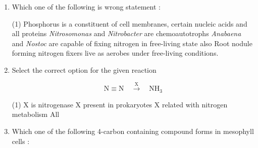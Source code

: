 \documentclass[twocolumn]{article}
\begin{document}
\begin{enumerate}
    Some plasmids may have only one or two copies per cell whereas others may have 15--100 copies per cell.
    
    Statement II :
    
    Plasmids and Bacteriophage have the ability to replicate within bacterial cell independent of the control of chromosomal DNA.
    
    Choose the correct answer from the option given
    below:
    
    \begin{tasks}(1)
        \task Both Statement I and Statement II are incorrect
        \task Statement I is correct but Statement II is incorrect
        \task Statement I is incorrect but Statement II is correct
        \task Both Statement I and Statement II are correct
    \end{tasks}
    \item Which one of the following is wrong statement :
    \begin{tasks}(1)
        \task Phosphorus is a constituent of cell membranes, certain nucleic acids and all proteins
        \task \textit{Nitrosomonas} and \textit{Nitrobacter} are chemoautotrophs
        \task \textit{Anabaena} and \textit{Nostoc} are capable of fixing nitrogen in free-living state also
        \task Root nodule forming nitrogen fixers live as aerobes under free-living conditions.
    \end{tasks}
    \item Select the correct option for the given reaction
    
    \begin{center}
        \[\text{N} \equiv \text{N} \quad \stackrel{\text{X}}{\longrightarrow} \quad \text{NH}_3\]
    \end{center}
    
    \begin{tasks}(1)
        \task X is nitrogenase
        \task X present in prokaryotes
        \task X related with nitrogen metabolism
        \task All
    \end{tasks}
    \item Which one of the following 4-carbon containing compound forms in mesophyll cells :
    

\end{enumerate}
\end{document}
